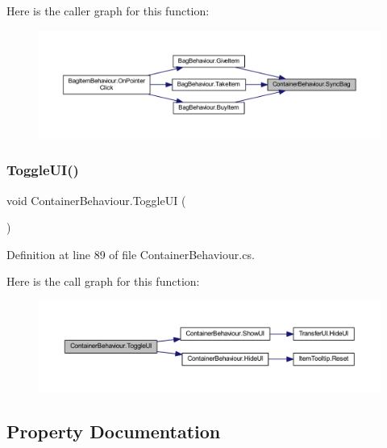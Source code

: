 Here is the caller graph for this function\+:
\nopagebreak
\begin{figure}[H]
\begin{center}
\leavevmode
\includegraphics[width=350pt]{class_container_behaviour_aea3c37f67bc244516f307f2c59a27b8f_icgraph}
\end{center}
\end{figure}
\mbox{\label{class_container_behaviour_a12b621fb47599b10bec679acb4cbe24e}} 
\subsubsection{\texorpdfstring{ToggleUI()}{ToggleUI()}}
{\footnotesize\ttfamily void Container\+Behaviour.\+Toggle\+UI (\begin{DoxyParamCaption}{ }\end{DoxyParamCaption})}



Definition at line 89 of file Container\+Behaviour.\+cs.

Here is the call graph for this function\+:
\nopagebreak
\begin{figure}[H]
\begin{center}
\leavevmode
\includegraphics[width=350pt]{class_container_behaviour_a12b621fb47599b10bec679acb4cbe24e_cgraph}
\end{center}
\end{figure}


\subsection{Property Documentation}
\mbox{\label{class_container_behaviour_ab0e91f3cfb15de3442dbef4ac2885c21}} 

